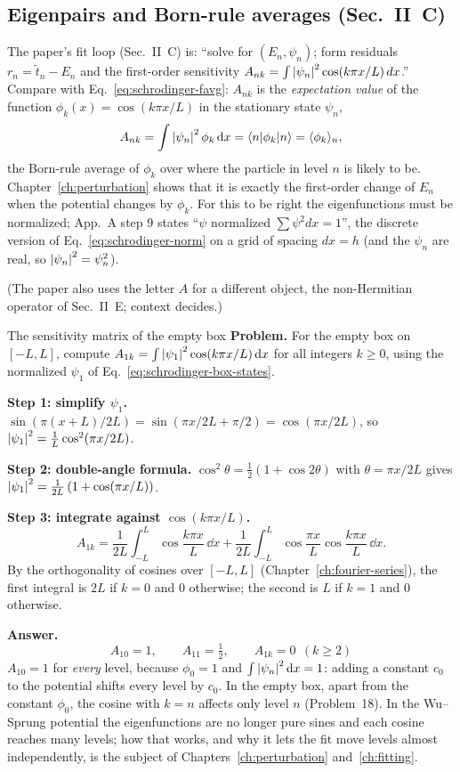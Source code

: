 \subsection{Eigenpairs and Born-rule averages (Sec.~II~C)}

The paper's fit loop (Sec.~II~C) is: ``solve for $(E_n,\psi_n)$; form residuals $r_n=\tilde t_n-E_n$ and the first-order sensitivity $A_{nk}=\int\left\lvert \psi_n\right\rvert^2\cos(k\pi x/L)\,dx$.'' Compare with Eq.~\eqref{eq:schrodinger-favg}: $A_{nk}$ is the \emph{expectation value} of the function $\phi_k(x)=\cos(k\pi x/L)$ in the stationary state $\psi_n$,
\begin{equation}
A_{nk}=\int\left\lvert \psi_n\right\rvert^2\phi_k\,\mathrm{d} x=\langle n|\phi_k|n\rangle=\langle\phi_k\rangle_n,
\label{eq:schrodinger-Ank}
\end{equation}
the Born-rule average of $\phi_k$ over where the particle in level $n$ is likely to be. Chapter~\ref{ch:perturbation} shows that it is exactly the first-order change of $E_n$ when the potential changes by $\phi_k$. For this to be right the eigenfunctions must be normalized; App.~A step 9 states ``$\psi$ normalized $\sum\psi^2dx=1$'', the discrete version of Eq.~\eqref{eq:schrodinger-norm} on a grid of spacing $dx=h$ (and the $\psi_n$ are real, so $\left\lvert \psi_n\right\rvert^2=\psi_n^2$).

(The paper also uses the letter $A$ for a different object, the non-Hermitian operator of Sec.~II~E; context decides.)

\begin{sample}{The sensitivity matrix of the empty box}
\textbf{Problem.} For the empty box on $[-L,L]$, compute $A_{1k}=\int\left\lvert \psi_1\right\rvert^2\cos(k\pi x/L)\,\mathrm{d} x$ for all integers $k\ge0$, using the normalized $\psi_1$ of Eq.~\eqref{eq:schrodinger-box-states}.

\textbf{Step 1: simplify $\psi_1$.} $\sin(\pi(x+L)/2L)=\sin(\pi x/2L+\pi/2)=\cos(\pi x/2L)$, so $\left\lvert \psi_1\right\rvert^2=\frac1L\cos^2(\pi x/2L)$.

\textbf{Step 2: double-angle formula.} $\cos^2\theta=\tfrac12(1+\cos2\theta)$ with $\theta=\pi x/2L$ gives $\left\lvert \psi_1\right\rvert^2=\frac1{2L}\left(1+\cos(\pi x/L)\right)$.

\textbf{Step 3: integrate against $\cos(k\pi x/L)$.} 
\[
A_{1k}=\frac1{2L}\int_{-L}^{L}\cos\frac{k\pi x}{L}\,\dd x+\frac1{2L}\int_{-L}^{L}\cos\frac{\pi x}L\cos\frac{k\pi x}L\,\dd x.
\]
By the orthogonality of cosines over $[-L,L]$ (Chapter~\ref{ch:fourier-series}), the first integral is $2L$ if $k=0$ and $0$ otherwise; the second is $L$ if $k=1$ and $0$ otherwise.

\textbf{Answer.}
\[
\boxed{A_{10}=1,\qquad A_{11}=\tfrac12,\qquad A_{1k}=0\ \ (k\ge2)}
\]
$A_{10}=1$ for \emph{every} level, because $\phi_0=1$ and $\int\left\lvert \psi_n\right\rvert^2\mathrm{d} x=1$: adding a constant $c_0$ to the potential shifts every level by $c_0$. In the empty box, apart from the constant $\phi_0$, the cosine with $k=n$ affects only level $n$ (Problem~18). In the Wu--Sprung potential the eigenfunctions are no longer pure sines and each cosine reaches many levels; how that works, and why it lets the fit move levels almost independently, is the subject of Chapters~\ref{ch:perturbation} and~\ref{ch:fitting}.
\end{sample}

